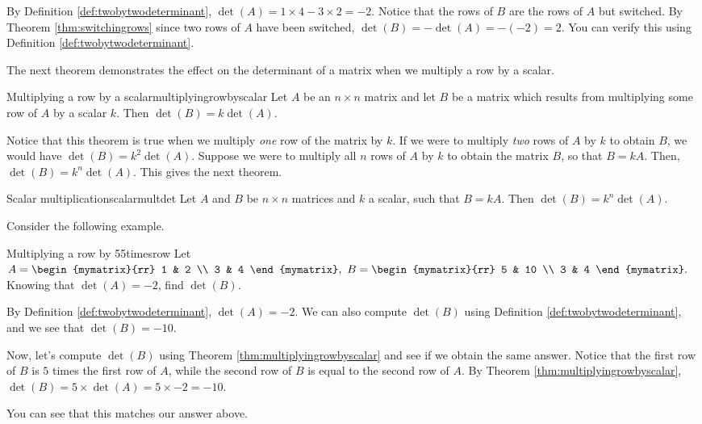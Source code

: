\begin{solution}
By Definition \ref{def:twobytwodeterminant}, 
$\det \left(A\right) = 1 \times 4 - 3 \times 2 = -2$. 
Notice that the rows of $B$ are the rows of $A$ but switched. 
By Theorem \ref{thm:switchingrows} since two rows of $A$ have been switched,
$\det \left(B\right) = - \det \left(A\right) = - \left(-2\right) = 2$.
You can verify this using Definition \ref{def:twobytwodeterminant}. 
\end{solution}

The next theorem demonstrates the effect on the determinant of a matrix when we multiply
a row by a scalar.

\begin{theorem}{Multiplying a row by a scalar}{multiplyingrowbyscalar}
Let $A$ be an $n\times n$ matrix and let $B$ be a matrix
which results from multiplying some row of $A$ by a scalar $k$. Then $\det
\left( B\right) = k \det \left( A\right) $.
\end{theorem}

Notice that this theorem is true when we multiply {\em one\em} row of the matrix by $k$.
If we were to multiply {\em two\em} rows of $A$ by $k$ to obtain $B$, we would have
$\det \left(B\right) = k^2 \det \left(A\right)$.
Suppose we were to multiply all $n$ rows of $A$ by $k$ to obtain the matrix $B$, so that 
$B = kA$. Then, $\det \left(B\right) = k^n \det \left(A\right)$. This gives the next theorem.

\begin{theorem}{Scalar multiplication}{scalarmultdet}
Let $A$ and $B$ be $n \times n$ matrices and $k$ a scalar, such that $B = kA$. Then $\det(B) = k^n \det(A)$.
\end{theorem}

Consider the following example.

\begin{example}{Multiplying a row by 5}{5timesrow}
Let $A=\begin{mymatrix}{rr}
1 & 2 \\
3 & 4
\end{mymatrix} ,\ B=\begin{mymatrix}{rr}
5 & 10 \\
3 & 4
\end{mymatrix} .$ 
Knowing that $\det \left( A \right) =-2$, find  $\det \left( B \right) $.
\end{example}

\begin{solution} 
By Definition \ref{def:twobytwodeterminant}, $\det \left( A\right) =-2.$ We can also compute
$\det \left(B\right)$ using Definition \ref{def:twobytwodeterminant}, and we see that $\det \left(B\right) = -10$. 

Now, let's compute  $\det \left(B\right)$ using Theorem \ref{thm:multiplyingrowbyscalar} and see if we
obtain the same answer. Notice that the first row of $B$ is $5$ times the first row of $A$, while the
second row of $B$ is equal to the second row of $A$. 
By Theorem \ref{thm:multiplyingrowbyscalar}, 
$\det  \left( B \right) = 5 \times \det \left( A \right) = 5 \times -2 = -10.$

You can see that this matches our answer above.
\end{solution}

